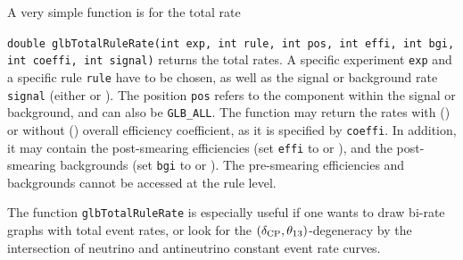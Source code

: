 A very simple function is for the total rate
\begin{function}
{\tt double glbTotalRuleRate(int exp, int rule, int pos,
int effi, int bgi, int coeffi, int signal)} returns the total rates.
A specific experiment {\tt exp} and a 
specific rule {\tt rule} have to be chosen, as well as the signal
or background rate {\tt signal} (either  or ).
The position {\tt pos} refers to the component within the signal or 
background, and can also be {\tt GLB\_ALL}. The function may return
the rates with () or without ()
overall efficiency coefficient, as it is specified by {\tt coeffi}. 
In addition, it may contain the post-smearing efficiencies (set
{\tt effi} to  or ), and the
post-smearing backgrounds (set
{\tt bgi} to  or ). The pre-smearing
efficiencies and backgrounds cannot be accessed at the rule level.
\end{function}
The function {\tt glbTotalRuleRate} is especially useful if
one wants to draw bi-rate graphs with total event rates, or look
for the $(\delta_{\mathrm{CP}},\theta_{13})$-degeneracy by the intersection of 
neutrino and antineutrino constant event rate curves.

